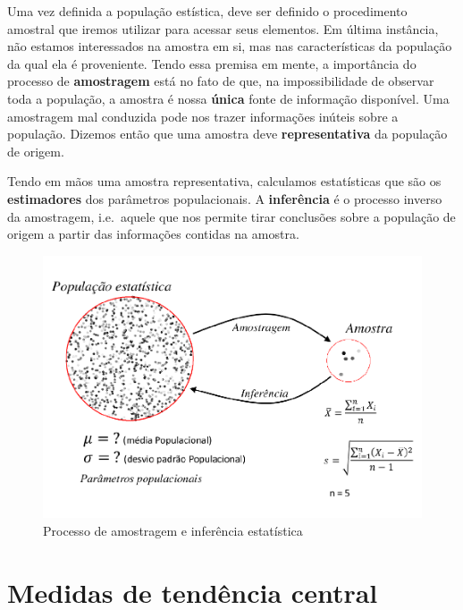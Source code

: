 \documentclass[
]{book}
\begin{document}
Uma vez definida a população estística, deve ser definido o procedimento amostral que iremos utilizar para acessar seus elementos. Em última instância, não estamos interessados na amostra em si, mas nas características da população da qual ela é proveniente. Tendo essa premisa em mente, a importância do processo de \textbf{amostragem} está no fato de que, na impossibilidade de observar toda a população, a amostra é nossa \textbf{única} fonte de informação disponível. Uma amostragem mal conduzida pode nos trazer informações inúteis sobre a população. Dizemos então que uma amostra deve \textbf{representativa} da população de origem.

Tendo em mãos uma amostra representativa, calculamos estatísticas que são os \textbf{estimadores} dos parâmetros populacionais. A \textbf{inferência} é o processo inverso da amostragem, i.e.~aquele que nos permite tirar conclusões sobre a população de origem a partir das informações contidas na amostra.

\begin{figure}

{\centering \includegraphics{probest-cambientais_files/figure-latex/amostr-1} 

}

\caption{Processo de amostragem e inferência estatística}\label{fig:amostr}
\end{figure}

\hypertarget{medidas-de-tenduxeancia-central}{%
\section{Medidas de tendência central}\label{medidas-de-tenduxeancia-central}}
\end{document}
